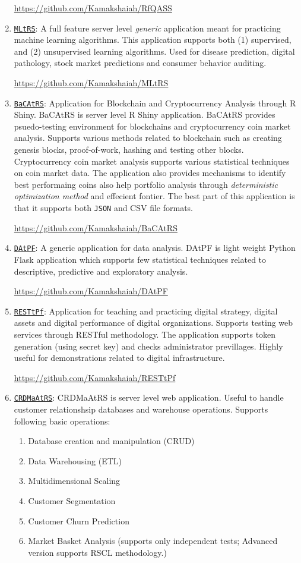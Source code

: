 \documentclass[10pt]{article}
\begin{document}
\begin{multicols}{2}
\begin{enumerate}
\url{https://github.com/Kamakshaiah/RfQASS}

\item \texttt{\underline{MLtRS}}: A full feature server level \emph{generic} application meant for practicing machine learning algorithms. This application supports both (1) supervised, and (2) unsupervised learning algorithms. Used for disease prediction, digital pathology, stock market predictions and consumer behavior auditing. 

\url{https://github.com/Kamakshaiah/MLtRS}

\item \texttt{\underline{BaCAtRS}}: Application for Blockchain and Cryptocurrency Analysis through R Shiny. BaCAtRS is server level R Shiny application. BaCAtRS provides psuedo-testing environment for blockchains and cryptocurrency coin market analysis. Supports various methods related to blockchain such as creating genesis blocks, proof-of-work, hashing and testing other blocks. Cryptocurrency coin market analysis supports various statistical techniques on coin market data. The application also provides mechanisms to identify best performaing coins also help portfolio analysis through \emph{deterministic optimization method} and effecient fontier. The best part of this application is that it supports both \texttt{JSON} and CSV file formats.  

\url{https://github.com/Kamakshaiah/BaCAtRS}

\item \texttt{\underline{DAtPF}}: A generic application for data analysis. DAtPF is light weight Python Flask application which supports few statistical techniques related to descriptive, predictive and exploratory analysis. 

\url{https://github.com/Kamakshaiah/DAtPF}

\item \texttt{\underline{RESTtPf}}: Application for teaching and practicing digital strategy, digital assets and digital performance of digital organizations. Supports testing web services through RESTful methodology. The application supports token generation (using secret key) and checks administrator previllages. Highly useful for demonstrations related to digital infrastructure.  

\url{https://github.com/Kamakshaiah/RESTtPf}

\item \texttt{\underline{CRDMaAtRS}}: CRDMaAtRS is server level web application. Useful to handle customer relationshsip databases and warehouse operations. Supports following basic operations:
\begin{enumerate}
\item Database creation and manipulation (CRUD)
\item Data Warehousing (ETL)
\item Multidimensional Scaling
\item Customer Segmentation
\item Customer Churn Prediction
\item Market Basket Analysis (supports only independent tests; Advanced version supports RSCL methodology.)


\end{enumerate}
\end{enumerate}
\end{multicols}
\end{document}
